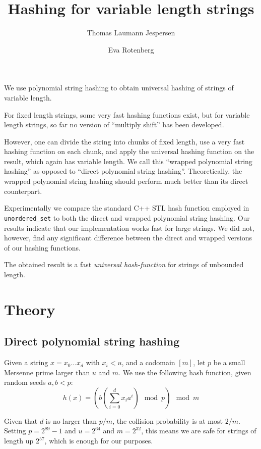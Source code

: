 \documentclass[]{article}
\title{Hashing for variable length strings}
\author{Thomas Laumann Jespersen \and Eva Rotenberg}
\newcommand{\funk}[1]{\small\texttt{#1}}
\newcommand{\cpp}{C+\!+\xspace}
\begin{document}
\maketitle

We use polynomial string hashing to obtain universal hashing of strings of variable length.

For fixed length strings, some very fast hashing functions exist, but for variable length strings, so far no version of ``multiply shift'' has been developed. 

However, one can divide the string into chunks of fixed length, use a very fast hashing function on each chunk, and apply the universal hashing function on the result, which again has variable length. We call this ``wrapped polynomial string hashing'' as opposed to ``direct polynomial string hashing''. Theoretically, the wrapped polynomial string hashing should perform much better than its direct counterpart. 

Experimentally we compare the standard \cpp STL hash function employed in \funk{unordered\_set} to both the direct and wrapped polynomial string hashing. Our results indicate that our implementation works fast for large strings. We did not, however, find any significant difference between the direct and wrapped versions of our hashing functions.


The obtained result is a fast \emph{universal hash-function} for strings of unbounded length. %

\section{Theory}

\subsection*{Direct polynomial string hashing}

Given a string $x=x_0 \ldots x_d$ with $x_i < u$, and a codomain $[m]$, let $p$ be a small Mersenne prime larger than $u$ and $m$. We use the following hash function, given random seeds $a,b < p$:
\[h(x)= \left( b \left( \sum_{i=0}^{d}x_i a^i \right) \mod p \right) \mod m \]

Given that $d$ is no larger than $p/m$, the collision probability is at most $2/m$. Setting $p=2^{89}-1$ and $u=2^{64}$ and $m=2^{32}$, this means we are safe for strings of length up $2^{57}$, which is enough for our purposes.
\end{document}
